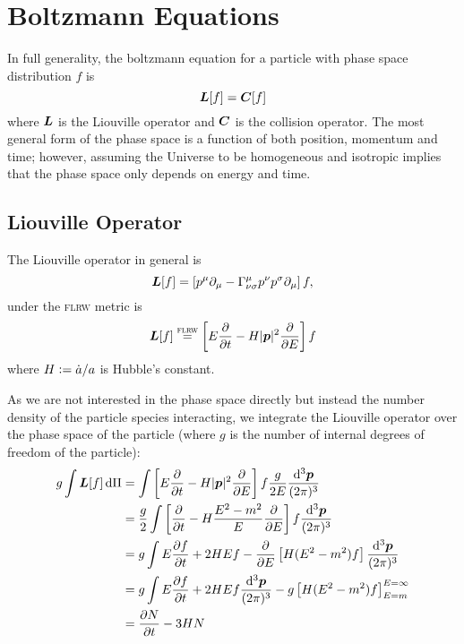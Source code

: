 \documentclass[
  a4paper,             %
  11pt,                %
  oneside,             %
  onecolumn,           %
  bibliography=totoc,  %
  final,               %
]{scrartcl}
\begin{document}
\clearpage
\section{Boltzmann Equations}%
\label{sec:boltzmann_equations}

In full generality, the boltzmann equation for a particle with phase space
distribution \(f\) is
\begin{equation}
  \boldsymbol{L}[f] = \boldsymbol{C}[f]
\end{equation}
where \(\boldsymbol{L}\) is the Liouville operator and \(\boldsymbol{C}\) is the collision
operator.  The most general form of the phase space is a function of both
position, momentum and time; however, assuming the Universe to be homogeneous
and isotropic implies that the phase space only depends on energy and time.

\subsection{Liouville Operator}%
\label{sec:liouville_operator}

The Liouville operator in general is
\begin{equation}
  \boldsymbol{L}[f] = \left[ p^\mu \partial_\mu - \Gamma^\mu_{\nu\sigma} p^\nu p^\sigma \partial_\mu \right] f,
\end{equation}
under the \textsc{flrw} metric is
\begin{equation}
  \boldsymbol{L}[f] \stackrel{\textsc{flrw}}{=} \left[E \frac{\partial{}}{\partial{t}} - H \lvert\boldsymbol{p}\rvert^2 \frac{\partial{}}{\partial{E}}\right] f
\end{equation}
where \(H \vcentcolon= \dot a / a\) is Hubble's constant.

As we are not interested in the phase space directly but instead the number
density of the particle species interacting, we integrate the Liouville operator
over the phase space of the particle (where \(g\) is the number of internal
degrees of freedom of the particle):
\begin{subequations}
  \begin{align}
    g \int \vt L[f] \dd \Pi
    &= \int \left[E \pfrac{}{t} - H \abs{\vt p}^2 \pfrac{}{E}\right] f \frac{g}{2E} \ddbar^3{\vt p} \\
    &= \frac{g}{2} \int \left[\pfrac{}{t} - H \frac{E^2 - m^2}{E} \pfrac{}{E}\right] f \ddbar^3{\vt p} \\
    &= g \int E \pfrac{f}{t} + 2 H E f - \pfrac{}{E} \left[H (E^2 - m^2) f \right] \ddbar^3{\vt p} \\
    &= g \int E \pfrac{f}{t} + 2 H E f \ddbar^3{\vt p} - g \left[H (E^2 - m^2) f \right]_{E = m}^{E = \infty} \\
    &= \pfrac{N}{t} - 3 H N
  \end{align}
\end{subequations}
\end{document}
